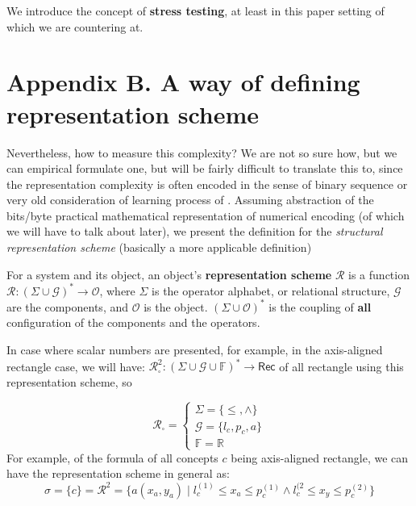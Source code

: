 \documentclass[10pt]{article} %
\begin{document}
We introduce the concept of \textbf{stress testing}, at least in this paper setting of which we are countering at. 

\section*{Appendix B. A way of defining representation scheme}

Nevertheless, how to measure this complexity? We are not so sure how, but we can empirical formulate one, but will be fairly difficult to translate this to, since the representation complexity is often encoded in the sense of binary sequence or very old consideration of learning process of \cite{10.5555/200548}. Assuming abstraction of the bits/byte practical mathematical representation of numerical encoding (of which we will have to talk about later), we present the definition for the \textit{structural representation scheme} (basically a more applicable definition)

\begin{definition}
    For a system and its object, an object's \textbf{representation scheme} $\mathcal{R}$ is a function $\bm{\mathcal{R}}: (\Sigma\cup \mathcal{G})^{*}\to \mathcal{O}$, where $\Sigma$ is the operator alphabet, or relational structure, $\mathcal{G}$ are the components, and $\mathcal{O}$ is the object. $(\Sigma \cup \mathcal{O})^{*}$ is the coupling of \textbf{all} configuration of the components and the operators. 
\end{definition}

In case where scalar numbers are presented, for example, in the axis-aligned rectangle case, we will have: $\bm{\mathcal{R}}^{2}_{\square}:(\Sigma\cup \mathcal{G}\cup\mathbb{F})^{*}\to \mathsf{Rec}$ of all rectangle using this representation scheme, so 

\begin{equation}
    \bm{\mathcal{R}}_{\square} = \begin{cases}
        \Sigma = \{\leq, \land \}\\
        \mathcal{G} = \{l_{c}, p_{c}, a\}\\
        \mathbb{F} = \mathbb{R}
    \end{cases}
\end{equation}
For example, of the formula of all concepts $c$ being axis-aligned rectangle, we can have the representation scheme in general as: 
\begin{equation}
    \sigma = \{c\} = \bm{\mathcal{R}}^{2} = \{a(x_{a},y_{a}) \mid l_{c}^{(1)} \leq x_{a}\leq p_{c}^{(1)}\land l_{c}^{(2} \leq x_{y}\leq p_{c}^{(2)}\}
\end{equation}
\end{document}
